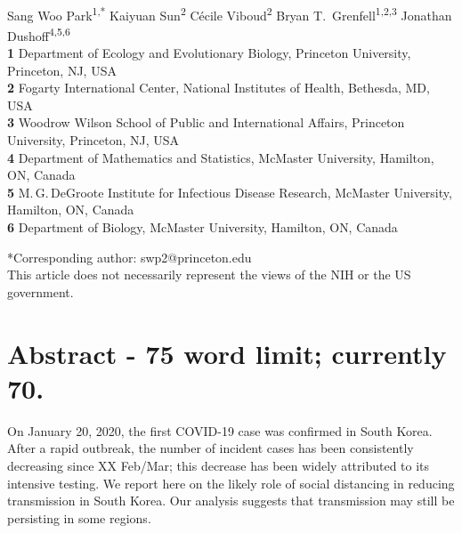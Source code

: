 \documentclass[12pt]{article}
\date{\today}
\begin{document}
\begin{flushleft}{
	\Large
	\textbf{}
}
\newline
\\
Sang Woo Park\textsuperscript{1,*}
Kaiyuan Sun\textsuperscript{2}
C\'ecile Viboud\textsuperscript{2}
Bryan T.\ Grenfell\textsuperscript{1,2,3}
Jonathan Dushoff\textsuperscript{4,5,6}
\\
\bigskip
\textbf{1} Department of Ecology and Evolutionary Biology, Princeton University, Princeton, NJ, USA
\\
\textbf{2} Fogarty International Center, National Institutes of Health, Bethesda, MD, USA
\\
\textbf{3} Woodrow Wilson School of Public and International Affairs, Princeton University, Princeton, NJ, USA
\\
\textbf{4} Department of Mathematics and Statistics, McMaster University, Hamilton, ON, Canada
\\
\textbf{5} M.\,G.\,DeGroote Institute for Infectious Disease Research, McMaster University, Hamilton, ON, Canada
\\
\textbf{6} Department of Biology, McMaster University, Hamilton, ON, Canada
\\
\bigskip

*Corresponding author: swp2@princeton.edu\\
This article does not necessarily represent the views of the NIH or the US government.
\end{flushleft}

\section*{Abstract - 75 word limit; currently 70.}

On January 20, 2020, the first COVID-19 case was confirmed in South Korea.
After a rapid outbreak, the number of incident cases has been consistently decreasing since XX Feb/Mar;
this decrease has been widely attributed to its intensive testing.
We report here on the likely role of social distancing in reducing transmission in South Korea.
Our analysis suggests that transmission may still be persisting in some regions.

\pagebreak
\end{document}
